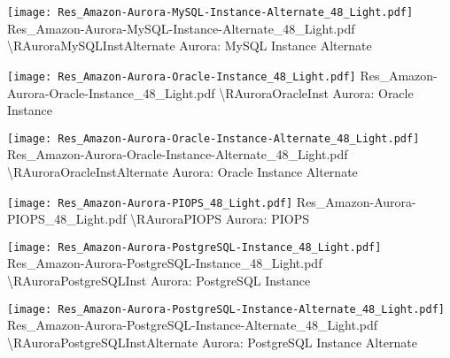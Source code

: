  {\texttt{[image: Res\_Amazon-Aurora-MySQL-Instance-Alternate\_48\_Light.pdf]}} {Res\_Amazon-Aurora-MySQL-Instance-Alternate\_48\_Light.pdf} {{\textbackslash}RAuroraMySQLInstAlternate} {Aurora: MySQL Instance Alternate}

 {\texttt{[image: Res\_Amazon-Aurora-Oracle-Instance\_48\_Light.pdf]}} {Res\_Amazon-Aurora-Oracle-Instance\_48\_Light.pdf} {{\textbackslash}RAuroraOracleInst} {Aurora: Oracle Instance}

 {\texttt{[image: Res\_Amazon-Aurora-Oracle-Instance-Alternate\_48\_Light.pdf]}} {Res\_Amazon-Aurora-Oracle-Instance-Alternate\_48\_Light.pdf} {{\textbackslash}RAuroraOracleInstAlternate} {Aurora: Oracle Instance Alternate}

 {\texttt{[image: Res\_Amazon-Aurora-PIOPS\_48\_Light.pdf]}} {Res\_Amazon-Aurora-PIOPS\_48\_Light.pdf} {{\textbackslash}RAuroraPIOPS} {Aurora: PIOPS}

 {\texttt{[image: Res\_Amazon-Aurora-PostgreSQL-Instance\_48\_Light.pdf]}} {Res\_Amazon-Aurora-PostgreSQL-Instance\_48\_Light.pdf} {{\textbackslash}RAuroraPostgreSQLInst} {Aurora: PostgreSQL Instance}

 {\texttt{[image: Res\_Amazon-Aurora-PostgreSQL-Instance-Alternate\_48\_Light.pdf]}} {Res\_Amazon-Aurora-PostgreSQL-Instance-Alternate\_48\_Light.pdf} {{\textbackslash}RAuroraPostgreSQLInstAlternate} {Aurora: PostgreSQL Instance Alternate}


